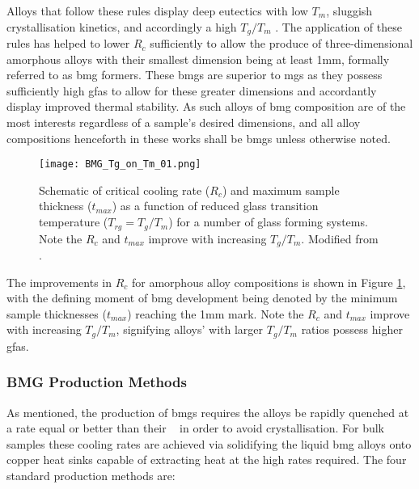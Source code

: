 \documentclass[a4paper,12pt,oneside]{report}%
\begin{document}
Alloys that follow these rules display deep eutectics with low $T_{m}$, sluggish crystallisation kinetics, and accordingly a high $T_{g}/T_{m}$ \cite{Inoue2000, Schroers2010}. The application of these rules has helped to lower $R_{c}$ sufficiently to allow the produce of three-dimensional amorphous alloys with their smallest dimension being at least 1mm, formally referred to as \gls{bmg} formers. These \glspl{bmg} are superior to \glspl{mg} as they possess sufficiently high \glspl{gfa} to allow for these greater dimensions and accordantly display improved thermal stability. As such alloys of \gls{bmg} composition are of the most interests regardless of a sample's desired dimensions, and all alloy compositions henceforth in these works shall be \glspl{bmg} unless otherwise noted. 

\begin{figure}[htbp]
	\centering
	\texttt{[image: BMG\_Tg\_on\_Tm\_01.png]}
	\caption[Schematic of critical cooling rate ($R_{c}$) and maximum sample thickness ($t_{max}$) as a function of reduced glass transition temperature ($T_{rg}=T_{g}/T_{m}$) for a number of glass forming systems. Note the $R_{c}$ and $t_{max}$ improve with increasing $T_{g}/T_{m}$.]{Schematic of critical cooling rate ($R_{c}$) and maximum sample thickness ($t_{max}$) as a function of reduced glass transition temperature ($T_{rg}=T_{g}/T_{m}$) for a number of glass forming systems. Note the $R_{c}$ and $t_{max}$ improve with increasing $T_{g}/T_{m}$. Modified from \cite{Trexler2010}.}
	\label{fig:BMGRc}
\end{figure}

The improvements in $R_{c}$ for amorphous alloy compositions is shown in Figure \ref{fig:BMGRc}, with the defining moment of \gls{bmg} development being denoted by the minimum sample thicknesses ($t_{max}$) reaching the 1mm mark. Note the $R_{c}$ and $t_{max}$ improve with increasing $T_{g}/T_{m}$, signifying alloys' with larger $T_{g}/T_{m}$ ratios possess higher \glspl{gfa}. 

\subsubsection{BMG Production Methods}
As mentioned, the production of \glspl{bmg} requires the alloys be rapidly quenched at a rate equal or better than their \Rc~ in order to avoid crystallisation. For bulk samples these cooling rates are achieved via solidifying the liquid \gls{bmg} alloys onto copper heat sinks capable of extracting heat at the high rates required. The four standard production methods are: 
\end{document}
